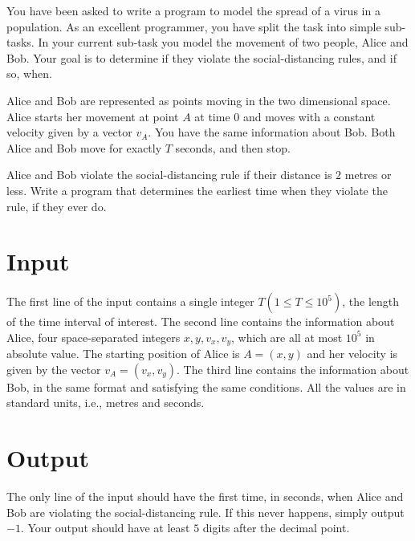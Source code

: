 You have been asked to write a program to model the spread of a virus in a population.
As an excellent programmer, you have split the task into simple sub-tasks.
In your current sub-task you model the movement of two people, Alice and Bob.
Your goal is to determine if they violate the social-distancing rules, and if so, when.

Alice and Bob are represented as points moving in the two dimensional space.
Alice starts her movement at point $A$ at time $0$ and
moves with a constant velocity given by a vector $v_A$.
You have the same information about Bob.
Both Alice and Bob move for exactly $T$ seconds, and then stop.

Alice and Bob violate the social-distancing rule if their distance is $2$ metres or less.
Write a program that determines the earliest time when they violate the rule, if they ever do.

\section*{Input}
The first line of the input contains a single integer $T (1 \leq T \leq 10^5)$, the length of the time interval of interest.
The second line contains the information about Alice, four space-separated integers $x, y, v_x, v_y$,  which are all at most $10^5$ in absolute value.
The starting position of Alice is $A = (x, y)$ and her velocity is given by the vector $v_A = (v_x, v_y)$.
The third line contains the information about Bob, in the same format and satisfying the same conditions.
All the values are in standard units, i.e., metres and seconds.

\section*{Output}
The only line of the input should have the first time, in seconds,
when Alice and Bob are violating the social-distancing rule.
If this never happens, simply output $-1$.
Your output should have at least $5$ digits after the decimal point.
